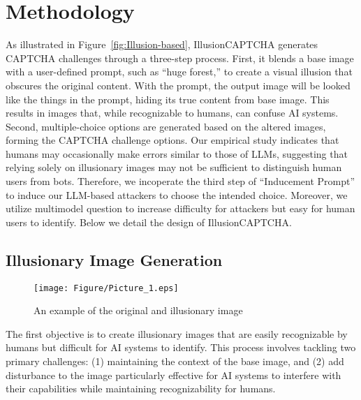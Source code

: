 
\section{Methodology}

As illustrated in Figure~\ref{fig:Illusion-based}, IllusionCAPTCHA generates CAPTCHA challenges through a three-step process. 
First, it blends a base image with a user-defined prompt, such as ``huge forest,'' to create a visual illusion that obscures the original content. With the prompt, the output image will be looked like the things in the prompt, hiding its true content from base image. This results in images that, while recognizable to humans, can confuse AI systems. 
Second, multiple-choice options are generated based on the altered images, forming the CAPTCHA challenge options.
Our empirical study indicates that humans may occasionally make errors similar to those of LLMs, suggesting that relying solely on illusionary images may not be sufficient to distinguish human users from bots. 
Therefore, we incoperate the third step of ``Inducement Prompt'' to induce our LLM-based attackers to choose the intended choice. Moreover, we utilize multimodel question to increase difficulty for attackers but easy for human users to identify. Below we detail the design of IllusionCAPTCHA.
%

\subsection{Illusionary Image Generation}

\begin{figure}[!t]
	\centering
    \texttt{[image: Figure/Picture\_1.eps]}
	\caption{An example of the original and illusionary image}
	\label{fig:Illusion-example}
\end{figure}
\label{sec:method}
The first objective is to create illusionary images that are easily recognizable by humans but difficult for AI systems to identify. This process involves tackling two primary challenges: (1) maintaining the context of the base image, and (2) add disturbance to the image particularly effective for AI systems to interfere with their capabilities while maintaining recognizability for humans. 

